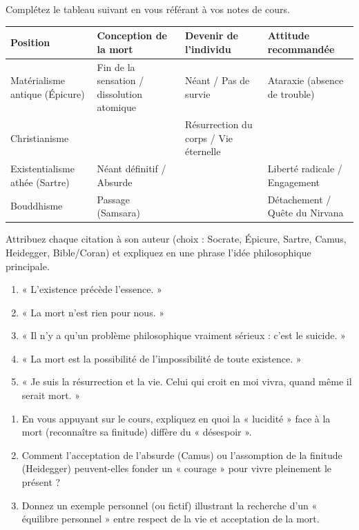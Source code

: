 \documentclass[11pt]{article}
\begin{document}
\begin{exercice}
Complétez le tableau suivant en vous référant à vos notes de cours.

\begin{tabularx}{\linewidth}{|X|X|X|X|}
\hline
\textbf{Position} & \textbf{Conception de la mort} & \textbf{Devenir de l'individu} & \textbf{Attitude recommandée} \\
\hline
Matérialisme antique (Épicure) & Fin de la sensation / dissolution atomique & Néant / Pas de survie & Ataraxie (absence de trouble) \\
\hline
Christianisme & & Résurrection du corps / Vie éternelle & \\
\hline
Existentialisme athée (Sartre) & Néant définitif / Absurde & & Liberté radicale / Engagement \\
\hline
Bouddhisme & Passage (Samsara) & & Détachement / Quête du Nirvana \\
\hline
\end{tabularx}
\end{exercice}

\begin{exercice}
Attribuez chaque citation à son auteur (choix : Socrate, Épicure, Sartre, Camus, Heidegger, Bible/Coran) et expliquez en une phrase l'idée philosophique principale.

\begin{enumerate}
    \item « L'existence précède l'essence. »
    \item « La mort n'est rien pour nous. »
    \item « Il n'y a qu'un problème philosophique vraiment sérieux : c'est le suicide. »
    \item « La mort est la possibilité de l'impossibilité de toute existence. »
    \item « Je suis la résurrection et la vie. Celui qui croit en moi vivra, quand même il serait mort. »
\end{enumerate}
\end{exercice}

\begin{exercice}
\begin{enumerate}
    \item En vous appuyant sur le cours, expliquez en quoi la « lucidité » face à la mort (reconnaître sa finitude) diffère du « désespoir ».
    \item Comment l'acceptation de l'absurde (Camus) ou l'assomption de la finitude (Heidegger) peuvent-elles fonder un « courage » pour vivre pleinement le présent ?
    \item Donnez un exemple personnel (ou fictif) illustrant la recherche d'un « équilibre personnel » entre respect de la vie et acceptation de la mort.
\end{enumerate}
\end{exercice}
\end{document}
